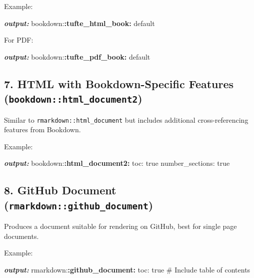 \documentclass[
]{book}
\newenvironment{Shaded}{\begin{snugshade}}{\end{snugshade}}
\newcommand{\AnnotationTok}[1]{\textcolor[rgb]{0.56,0.35,0.01}{\textbf{\textit{#1}}}}
\newcommand{\NormalTok}[1]{#1}
\newcommand{\SpecialCharTok}[1]{\textcolor[rgb]{0.81,0.36,0.00}{\textbf{#1}}}
\theoremstyle{definition}
\theoremstyle{definition}
\theoremstyle{definition}
\theoremstyle{definition}
\theoremstyle{remark}
\begin{document}
Example:

\begin{Shaded}
\begin{Highlighting}[]
\AnnotationTok{output:}
\NormalTok{  bookdown:}\SpecialCharTok{:tufte\_html\_book:}\NormalTok{ default}
\end{Highlighting}
\end{Shaded}

For PDF:

\begin{Shaded}
\begin{Highlighting}[]
\AnnotationTok{output:}
\NormalTok{  bookdown:}\SpecialCharTok{:tufte\_pdf\_book:}\NormalTok{ default}
\end{Highlighting}
\end{Shaded}

\subsection{\texorpdfstring{7. HTML with Bookdown-Specific Features (\texttt{bookdown::html\_document2})}{7. HTML with Bookdown-Specific Features (bookdown::html\_document2)}}\label{html-with-bookdown-specific-features-bookdownhtml_document2}

Similar to \texttt{rmarkdown::html\_document} but includes additional cross-referencing features from Bookdown.

Example:

\begin{Shaded}
\begin{Highlighting}[]
\AnnotationTok{output:}
\NormalTok{  bookdown:}\SpecialCharTok{:html\_document2:}
\NormalTok{    toc: true}
\NormalTok{    number\_sections: true}
\end{Highlighting}
\end{Shaded}

\subsection{\texorpdfstring{8. GitHub Document (\texttt{rmarkdown::github\_document})}{8. GitHub Document (rmarkdown::github\_document)}}\label{github-document-rmarkdowngithub_document}

Produces a document suitable for rendering on GitHub, best for single page documents.

Example:

\begin{Shaded}
\begin{Highlighting}[]
\AnnotationTok{output:}
\NormalTok{  rmarkdown:}\SpecialCharTok{:github\_document:}
\NormalTok{    toc: true  \# Include table of contents}
\end{Highlighting}
\end{Shaded}
\end{document}
